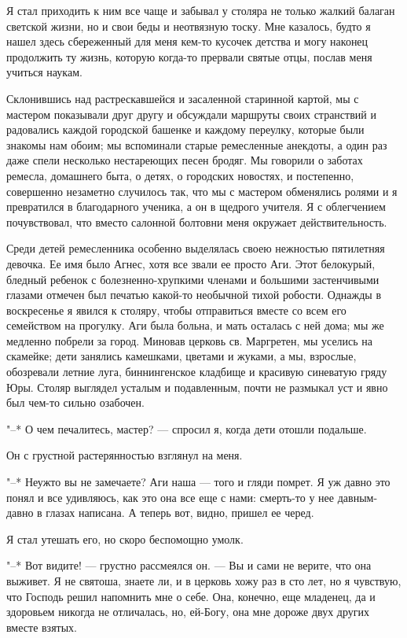 Я стал приходить к  ним все чаще и забывал у  столяра не только жалкий
балаган  светской  жизни, но  и  свои  беды  и неотвязную  тоску.  Мне
казалось,  будто я  нашел здесь  сбереженный для  меня кем-то  кусочек
детства и могу наконец продолжить  ту жизнь, которую когда-то прервали
святые отцы, послав меня учиться наукам.

Склонившись над  растрескавшейся и  засаленной старинной картой,  мы с
мастером показывали друг другу и обсуждали маршруты своих странствий и
радовались каждой  городской башенке и каждому  переулку, которые были
знакомы нам обоим;  мы вспоминали старые ремесленные  анекдоты, а один
раз  даже спели  несколько  нестареющих песен  бродяг.  Мы говорили  о
заботах  ремесла, домашнего  быта, о  детях, о  городских новостях,  и
постепенно,  совершенно незаметно  случилось  так, что  мы с  мастером
обменялись  ролями и  я превратился  в  благодарного ученика,  а он  в
щедрого  учителя. Я  с облегчением  почувствовал, что  вместо салонной
болтовни меня окружает действительность.

Среди   детей  ремесленника   особенно   выделялась  своею   нежностью
пятилетняя девочка. Ее  имя было Агнес, хотя все звали  ее просто Аги.
Этот  белокурый,  бледный  ребенок  с  болезненно-хрупкими  членами  и
большими застенчивыми  глазами отмечен был печатью  какой-то необычной
тихой  робости.  Однажды  в  воскресенье я  явился  к  столяру,  чтобы
отправиться  вместе  со всем  его  семейством  на прогулку.  Аги  была
больна, и мать  осталась с ней дома; мы же  медленно побрели за город.
Миновав церковь св.  Маргретен, мы уселись на  скамейке; дети занялись
камешками, цветами и  жуками, а мы, взрослые,  обозревали летние луга,
биннингенское кладбище и красивую синеватую гряду Юры. Столяр выглядел
усталым и подавленным, почти не размыкал  уст и явно был чем-то сильно
озабочен.

"--*  О чем  печалитесь,  мастер?  --- спросил  я,  когда дети  отошли
подальше.

Он с грустной растерянностью взглянул на меня.

"--* Неужто вы  не замечаете? Аги наша  --- того и гляди  помрет. Я уж
давно это понял и все удивляюсь, как это она все еще с нами: смерть-то
у нее давным-давно  в глазах написана. А теперь вот,  видно, пришел ее
черед.

Я стал утешать его, но скоро беспомощно умолк.

"--* Вот видите!  --- грустно рассмеялся он. --- Вы  и сами не верите,
что она выживет. Я  не святоша, знаете ли, и в церковь  хожу раз в сто
лет,  но я  чувствую, что  Господь решил  напомнить мне  о себе.  Она,
конечно,  еще младенец,  да  и здоровьем  никогда  не отличалась,  но,
ей-Богу, она мне дороже двух других вместе взятых.

